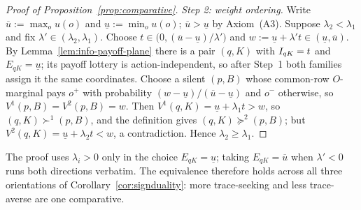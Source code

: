 \begin{proof}[Proof of Proposition~\ref{prop:comparative}]
\emph{Step 2: weight ordering.}  Write $\overline u:=\max_ou(o)$ and $\underline u:=\min_ou(o)$;
$\overline u>\underline u$ by Axiom~\textup{(A3)}.  Suppose $\lambda_2<\lambda_1$ and fix
$\lambda'\in(\lambda_2,\lambda_1)$.  Choose $t\in\bigl(0,(\overline u-\underline u)/\lambda'\bigr)$ and
$w:=\underline u+\lambda't\in(\underline u,\overline u)$.  By Lemma~\ref{lem:info-payoff-plane} there is a pair
$(q,K)$ with $I_{qK}=t$ and $E_{qK}=\underline u$; its payoff lottery is action-independent, so after Step~1
both families assign it the same coordinates.  Choose a silent $(p,B)$ whose common-row $O$-marginal pays
$o^+$ with probability $(w-\underline u)/(\overline u-\underline u)$ and $o^-$ otherwise, so
$V^1(p,B)=V^2(p,B)=w$.  Then $V^1(q,K)=\underline u+\lambda_1t>w$, so $(q,K)\succ^1(p,B)$, and the definition
gives $(q,K)\succeq^2(p,B)$; but $V^2(q,K)=\underline u+\lambda_2t<w$, a contradiction.  Hence
$\lambda_2\ge\lambda_1$.
\end{proof}

\begin{remark}
The proof uses $\lambda_i>0$ only in the choice $E_{qK}=\underline u$; taking $E_{qK}=\overline u$ when
$\lambda'<0$ runs both directions verbatim.  The equivalence therefore holds across all three orientations of
Corollary~\ref{cor:signduality}: more trace-seeking and less trace-averse are one comparative.
\end{remark}

